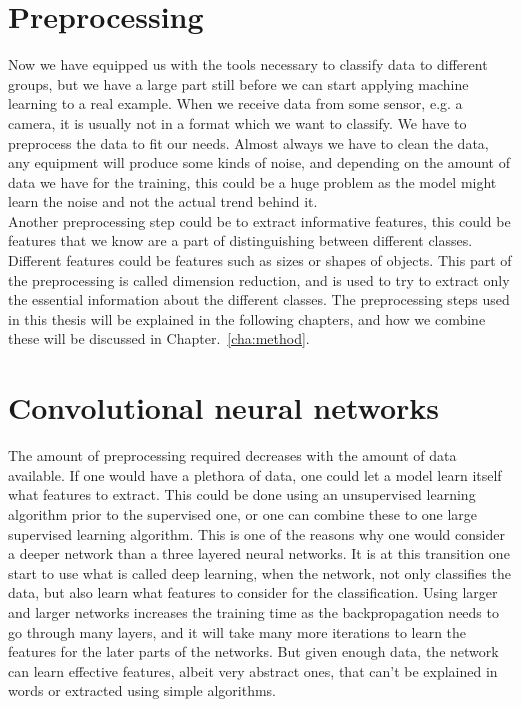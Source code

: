 \section{Preprocessing}
\label{sec:preprocessing}

Now we have equipped us with the tools necessary to classify data to different groups, but we have a large part still before we can start applying machine learning to a real example. When we receive data from some sensor, e.g. a camera, it is usually not in a format which we want to classify. We have to preprocess the data to fit our needs. Almost always we have to clean the data, any equipment will produce some kinds of noise, and depending on the amount of data we have for the training, this could be a huge problem as the model might learn the noise and not the actual trend behind it.\\

Another preprocessing step could be to extract informative features, this could be features that we know are a part of distinguishing between different classes. Different features could be features such as sizes or shapes of objects. This part of the preprocessing is called dimension reduction, and is used to try to extract only the essential information about the different classes. The preprocessing steps used in this thesis will be explained in the following chapters, and how we combine these will be discussed in Chapter.~\ref{cha:method}.

\section{Convolutional neural networks}

The amount of preprocessing required decreases with the amount of data available. If one would have a plethora of data, one could let a model learn itself what features to extract. This could be done using an unsupervised learning algorithm prior to the supervised one, or one can combine these to one large supervised learning algorithm. This is one of the reasons why one would consider a deeper network than a three layered neural networks. It is at this transition one start to use what is called deep learning, when the network, not only classifies the data, but also learn what features to consider for the classification. Using larger and larger networks increases the training time as the backpropagation needs to go through many layers, and it will take many more iterations to learn the features for the later parts of the networks. But given enough data, the network can learn effective features, albeit very abstract ones, that can't be explained in words or extracted using simple algorithms.\\

